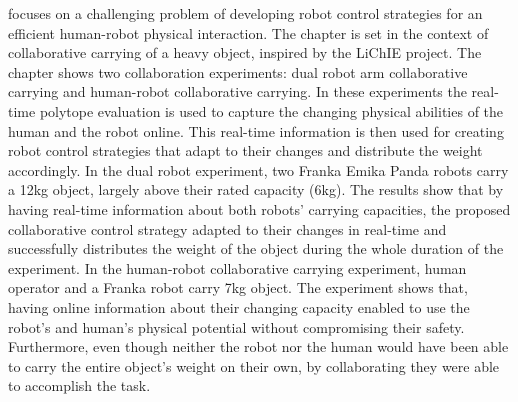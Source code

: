  focuses on a challenging problem of developing robot control strategies for an efficient human-robot physical interaction. The chapter is set in the context of collaborative carrying of a heavy object, inspired by the LiChIE project. 
The chapter shows two collaboration experiments: dual robot arm collaborative carrying and human-robot collaborative carrying. In these experiments the real-time polytope evaluation is used to capture the changing physical abilities of the human and the robot online. This real-time information is then used for creating robot control strategies that adapt to their changes and distribute the weight accordingly. In the dual robot experiment, two Franka Emika Panda robots carry a 12kg object, largely above their rated capacity (6kg). The results show that by having real-time information about both robots' carrying capacities, the proposed collaborative control strategy adapted to their changes in real-time and successfully distributes the weight of the object during the whole duration of the experiment. In the human-robot collaborative carrying experiment, human operator and a Franka robot carry 7kg object. The experiment shows that, having online information about their changing capacity enabled to use the robot's and human's physical potential without compromising their safety. Furthermore, even though neither the robot nor the human would have been able to carry the entire object's weight on their own, by collaborating they were able to accomplish the task.
 
